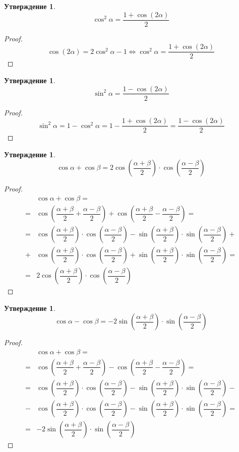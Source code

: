 \documentclass[12pt]{article}
\theoremstyle{definition}
\newtheorem{statement}[theorem]{Утверждение}
\begin{document}
    \begin{statement}
        $$\cos^2\alpha=\dfrac{1+\cos(2\alpha)}{2}$$
    \end{statement}
    \begin{proof}
        $$\cos (2\alpha)=2\cos^2\alpha-1\Longleftrightarrow \cos^2\alpha=\dfrac{1+\cos(2\alpha)}{2}$$
    \end{proof}
    \begin{statement}
        $$\sin^2\alpha=\dfrac{1-\cos(2\alpha)}{2}$$
    \end{statement}
    \begin{proof}
        $$\sin^2\alpha=1-\cos^2\alpha=1-\dfrac{1+\cos(2\alpha)}{2}=\dfrac{1-\cos(2\alpha)}{2}$$
    \end{proof}
    \begin{statement}
        $$\cos\alpha+\cos\beta=2\cos\left(\dfrac{\alpha+\beta}{2}\right)\cdot\cos\left(\dfrac{\alpha-\beta}{2}\right)$$
    \end{statement}
    \begin{proof}
        \begin{align*}
            &\cos\alpha+\cos\beta=\\
            =&\cos\left(\dfrac{\alpha+\beta}{2}+\dfrac{\alpha-\beta}{2}\right)+\cos\left(\dfrac{\alpha+\beta}{2}-\dfrac{\alpha-\beta}{2}\right)=\\
            =&\cos\left(\dfrac{\alpha+\beta}{2}\right)\cdot\cos\left(\dfrac{\alpha-\beta}{2}\right)-\sin\left(\dfrac{\alpha+\beta}{2}\right)\cdot\sin\left(\dfrac{\alpha-\beta}{2}\right)+\\
            +&\cos\left(\dfrac{\alpha+\beta}{2}\right)\cdot\cos\left(\dfrac{\alpha-\beta}{2}\right)+\sin\left(\dfrac{\alpha+\beta}{2}\right)\cdot\sin\left(\dfrac{\alpha-\beta}{2}\right)=\\
            =&2\cos\left(\dfrac{\alpha+\beta}{2}\right)\cdot\cos\left(\dfrac{\alpha-\beta}{2}\right)
        \end{align*}
    \end{proof}
    \begin{statement}
        $$\cos\alpha-\cos\beta=-2\sin\left(\dfrac{\alpha+\beta}{2}\right)\cdot\sin\left(\dfrac{\alpha-\beta}{2}\right)$$
    \end{statement}
    \begin{proof}
        \begin{align*}
            &\cos\alpha+\cos\beta=\\
            =&\cos\left(\dfrac{\alpha+\beta}{2}+\dfrac{\alpha-\beta}{2}\right)-\cos\left(\dfrac{\alpha+\beta}{2}-\dfrac{\alpha-\beta}{2}\right)=\\
            =&\cos\left(\dfrac{\alpha+\beta}{2}\right)\cdot\cos\left(\dfrac{\alpha-\beta}{2}\right)-\sin\left(\dfrac{\alpha+\beta}{2}\right)\cdot\sin\left(\dfrac{\alpha-\beta}{2}\right)-\\
            -&\cos\left(\dfrac{\alpha+\beta}{2}\right)\cdot\cos\left(\dfrac{\alpha-\beta}{2}\right)-\sin\left(\dfrac{\alpha+\beta}{2}\right)\cdot\sin\left(\dfrac{\alpha-\beta}{2}\right)=\\
            =&-2\sin\left(\dfrac{\alpha+\beta}{2}\right)\cdot\sin\left(\dfrac{\alpha-\beta}{2}\right)
        \end{align*}
    \end{proof}
\end{document}
